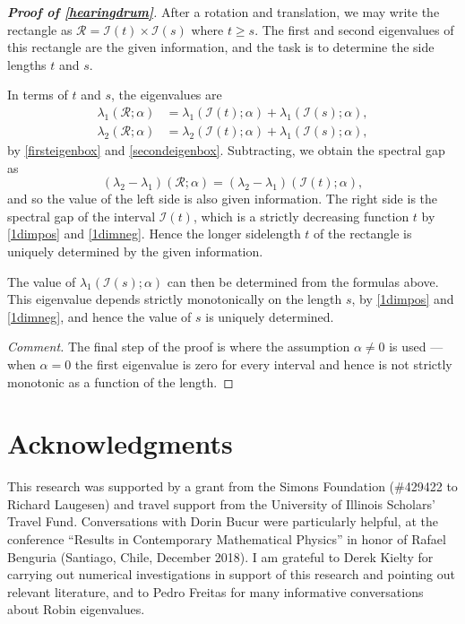 \documentclass[12pt,reqno]{amsart}
\theoremstyle{definition}
\begin{document}
%
\begin{proof}[\bf Proof of \autoref{hearingdrum}]
After a rotation and translation, we may write the rectangle as $\mathcal{R} = \mathcal{I}(t) \times \mathcal{I}(s)$ where $t \geq s$. The first and second eigenvalues of this rectangle are the given information, and the task is to determine the side lengths $t$ and $s$. 

In terms of $t$ and $s$, the eigenvalues are   
%
\begin{align*}
\lambda_1(\mathcal{R};\alpha) & = \lambda_1(\mathcal{I}(t);\alpha) + \lambda_1(\mathcal{I}(s);\alpha) , \\
\lambda_2(\mathcal{R};\alpha) & = \lambda_2(\mathcal{I}(t);\alpha) + \lambda_1(\mathcal{I}(s);\alpha) , 
\end{align*}
%
by \autoref{firsteigenbox} and \autoref{secondeigenbox}. Subtracting, we obtain the spectral gap as 
\[
(\lambda_2-\lambda_1)(\mathcal{R};\alpha) = (\lambda_2-\lambda_1)(\mathcal{I}(t);\alpha) ,
\]
and so the value of the left side is also given information. The right side is the spectral gap of the interval $\mathcal{I}(t)$, which is a strictly decreasing function $t$ by \autoref{1dimpos} and \autoref{1dimneg}. Hence the longer sidelength $t$ of the rectangle is uniquely determined by the given information. 

The value of $\lambda_1(\mathcal{I}(s);\alpha)$ can then be determined from the formulas above. This eigenvalue depends strictly monotonically on the length $s$, by \autoref{1dimpos} and \autoref{1dimneg}, and hence the value of $s$ is uniquely determined. 

\emph{Comment.} The final step of the proof is where  the assumption $\alpha \neq 0$ is used --- when $\alpha=0$ the first eigenvalue is zero for every interval and hence is not strictly monotonic as a function of the length.
\end{proof}
%


\section*{Acknowledgments}
This research was supported by a grant from the Simons Foundation (\#429422 to Richard Laugesen) and travel support from the University of Illinois Scholars' Travel Fund. Conversations  with Dorin Bucur were particularly helpful, at the conference ``Results in Contemporary Mathematical Physics'' in honor of Rafael Benguria (Santiago, Chile, December 2018). I am grateful to Derek Kielty for carrying out numerical investigations in support of this research and pointing out relevant literature, and to Pedro Freitas for many informative conversations about Robin eigenvalues. 
\end{document}
